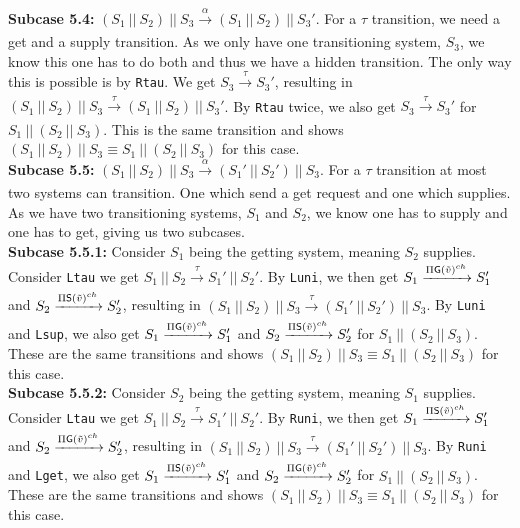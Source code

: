 \indent \textbf{Subcase 5.4: }$(S_1 \ || \ S_2)\ ||\ S_3 \xrightarrow[]{\alpha} (S_1 \ || \ S_2)\ ||\ S_3'$. For a $\tau$ transition, we need a get and a supply transition. As we only have one transitioning system, $S_3$, we know this one has to do both and thus we have a hidden transition. The only way this is possible is by \texttt{Rtau}. We get $S_3\xrightarrow[]{\tau} S_3'$, resulting in $(S_1 \ || \ S_2)\ ||\ S_3 \xrightarrow[]{\tau} (S_1 \ || \ S_2)\ ||\ S_3'$. By \texttt{Rtau} twice, we also get $S_3\xrightarrow[]{\tau} S_3'$ for $S_1 \ ||\ (S_2 \ || \ S_3)$. This is the same transition and shows $(S_1 \ ||\ S_2 )\ || \ S_3 \equiv S_1 \ ||\ (S_2 \ || \ S_3)$ for this case.\\
\indent \textbf{Subcase 5.5: }$(S_1 \ || \ S_2)\ ||\ S_3 \xrightarrow[]{\alpha} (S_1' \ || \ S_2')\ ||\ S_3$. For a $\tau$ transition at most two systems can transition. One which send a get request and one which supplies. As we have two transitioning systems, $S_1$ and $S_2$, we know one has to supply and one has to get, giving us two subcases.\\
\indent \indent \textbf{Subcase 5.5.1: } Consider $S_1$ being the getting system, meaning $S_2$ supplies. Consider \texttt{Ltau} we get $S_1 \ || \ S_2 \xrightarrow[]{\tau} S_1' \ || \ S_2'$. By \texttt{Luni}, we then get $S_1\xrightarrow[]{\Pi \mathsf{G}(\Tilde{v})^{ch}} S_1'$ and $S_2\xrightarrow[]{\Pi \mathsf{S}(\Tilde{v})^{ch}} S_2'$, resulting in $(S_1 \ || \ S_2)\ ||\ S_3 \xrightarrow[]{\tau} (S_1' \ || \ S_2')\ ||\ S_3$. By \texttt{Luni} and \texttt{Lsup}, we also get $S_1\xrightarrow[]{\Pi \mathsf{G}(\Tilde{v})^{ch}} S_1'$ and $S_2\xrightarrow[]{\Pi \mathsf{S}(\Tilde{v})^{ch}} S_2'$ for $S_1 \ ||\ (S_2 \ || \ S_3)$. These are the same transitions and shows $(S_1 \ ||\ S_2 )\ || \ S_3 \equiv S_1 \ ||\ (S_2 \ || \ S_3)$ for this case.\\
\indent \indent \textbf{Subcase 5.5.2: } Consider $S_2$ being the getting system, meaning $S_1$ supplies. Consider \texttt{Ltau} we get $S_1 \ || \ S_2 \xrightarrow[]{\tau} S_1' \ || \ S_2'$. By \texttt{Runi}, we then get $S_1\xrightarrow[]{\Pi \mathsf{S}(\Tilde{v})^{ch}} S_1'$ and $S_2\xrightarrow[]{\Pi \mathsf{G}(\Tilde{v})^{ch}} S_2'$, resulting in $(S_1 \ || \ S_2)\ ||\ S_3 \xrightarrow[]{\tau} (S_1' \ || \ S_2')\ ||\ S_3$. By \texttt{Runi} and \texttt{Lget}, we also get $S_1\xrightarrow[]{\Pi \mathsf{S}(\Tilde{v})^{ch}} S_1'$ and $S_2\xrightarrow[]{\Pi \mathsf{G}(\Tilde{v})^{ch}} S_2'$ for $S_1 \ ||\ (S_2 \ || \ S_3)$. These are the same transitions and shows $(S_1 \ ||\ S_2 )\ || \ S_3 \equiv S_1 \ ||\ (S_2 \ || \ S_3)$ for this case.\\
